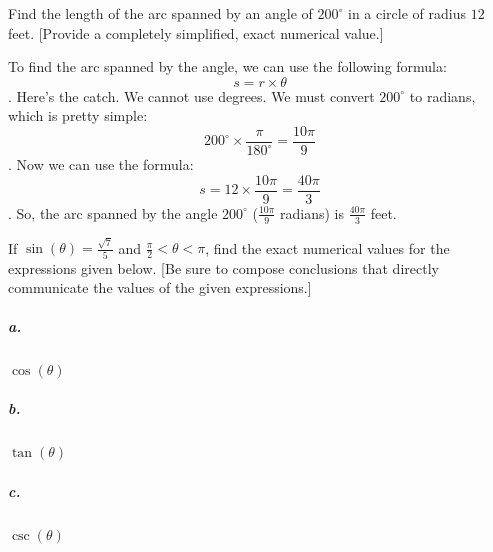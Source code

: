 \begin{problem}
  Find the length of the arc spanned by an angle of $200^{\circ}$ in a circle of
  radius $12$ feet. [Provide a completely simplified, exact numerical value.]

  \begin{figure}[H]
    \centering
    \label{fig:4_units}


    \caption{}
  \end{figure}
\end{problem}

\begin{solution}
  To find the arc spanned by the angle, we can use the following formula:
  \[ s = r \times \theta \].
  Here's the catch. We cannot use degrees. We must convert $200^{\circ}$ to
  radians, which is pretty simple:
  \[ 200^{\circ} \times \frac{\pi}{180^{\circ}} = \frac{10\pi}{9} \].
  Now we can use the formula:
  \[ s = 12 \times \frac{10\pi}{9} = \frac{40\pi}{3} \].
  So, the arc spanned by the angle $200^{\circ}$ ($\frac{10\pi}{9}$ radians) is
  $\frac{40\pi}{3}$ feet.
\end{solution}

\newpage

\begin{problem}
  If $\sin (\theta) = \frac{\sqrt{7}}{5}$ and $\frac{\pi}{2} < \theta < \pi$,
  find the exact numerical values for the expressions given below. [Be sure to
  compose conclusions that directly communicate the values of the given
  expressions.]

  \subparagraph{a.} $\cos (\theta)$

  \subparagraph{b.} $\tan (\theta)$

  \subparagraph{c.} $\csc (\theta)$
\end{problem}

